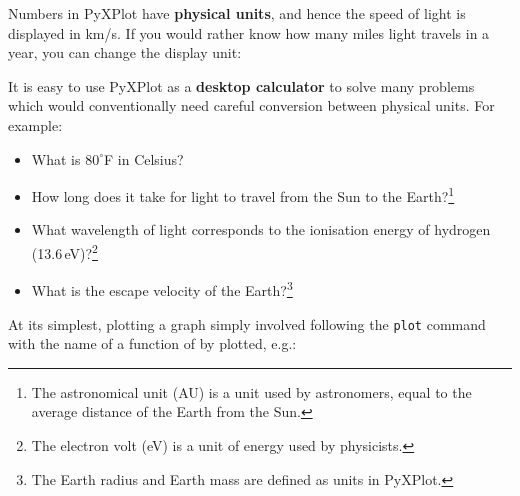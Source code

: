 \noindent Numbers in PyXPlot have {\bf physical units}, and hence the speed of
light is displayed in km/s. If you would rather know how many miles light
travels in a year, you can change the display unit:

\vspace{3mm}

\vspace{3mm}

\noindent It is easy to use PyXPlot as a {\bf desktop calculator} to solve many
problems which would conventionally need careful conversion between physical
units. For example:

\begin{itemize}
\item What is $80^\circ$F in Celsius?

\vspace{3mm}

\vspace{3mm}

\item How long does it take for light to travel from the Sun to the
Earth?\footnote{The astronomical unit (AU) is a unit used by astronomers, equal
to the average distance of the Earth from the Sun.}

\vspace{3mm}

\vspace{3mm}

\item What wavelength of light corresponds to the ionisation energy of hydrogen
(13.6\,eV)?\footnote{The electron volt (eV) is a unit of energy used by
physicists.}

\vspace{3mm}

\vspace{3mm}

\item What is the escape velocity of the Earth?\footnote{The Earth radius and
Earth mass are defined as units in PyXPlot.}

\vspace{3mm}

\vspace{3mm}
\end{itemize}


At its simplest, plotting a graph simply involved following the {\tt plot}
command with the name of a function of by plotted, e.g.:

